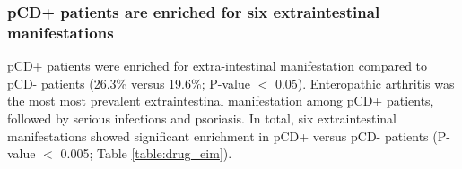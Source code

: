 \subsubsection{pCD+ patients are enriched for six extraintestinal manifestations}
pCD+ patients were enriched for extra-intestinal manifestation compared to pCD- patients (26.3\% versus 19.6\%; P-value $<$ 0.05). Enteropathic arthritis was the most most prevalent extraintestinal manifestation among pCD+ patients, followed by serious infections and psoriasis. In total, six extraintestinal manifestations showed significant enrichment in pCD+ versus pCD- patients (P-value $<$ 0.005; Table  \ref{table:drug_eim}).\\ %
